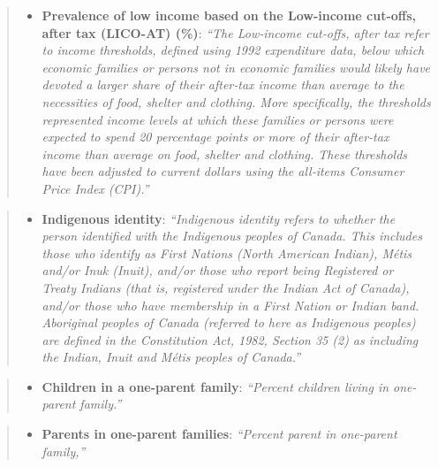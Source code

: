 \documentclass[preprint, 3p,
authoryear]{elsarticle} %
\providecommand{\tightlist}{%
  \setlength{\itemsep}{0pt}\setlength{\parskip}{0pt}}
\begin{document}
\begin{quote}
\begin{itemize}
\tightlist
\item
  \textbf{Prevalence of low income based on the Low-income cut-offs,
  after tax (LICO-AT) (\%)}: \emph{``The Low‑income cut‑offs, after tax
  refer to income thresholds, defined using 1992 expenditure data, below
  which economic families or persons not in economic families would
  likely have devoted a larger share of their after‑tax income than
  average to the necessities of food, shelter and clothing. More
  specifically, the thresholds represented income levels at which these
  families or persons were expected to spend 20 percentage points or
  more of their after‑tax income than average on food, shelter and
  clothing. These thresholds have been adjusted to current dollars using
  the all‑items Consumer Price Index (CPI).''}
\end{itemize}
\end{quote}

\begin{quote}
\begin{itemize}
\tightlist
\item
  \textbf{Indigenous identity}: \emph{``Indigenous identity refers to
  whether the person identified with the Indigenous peoples of Canada.
  This includes those who identify as First Nations (North American
  Indian), Métis and/or Inuk (Inuit), and/or those who report being
  Registered or Treaty Indians (that is, registered under the Indian Act
  of Canada), and/or those who have membership in a First Nation or
  Indian band. Aboriginal peoples of Canada (referred to here as
  Indigenous peoples) are defined in the Constitution Act, 1982, Section
  35 (2) as including the Indian, Inuit and Métis peoples of Canada.''}
\end{itemize}
\end{quote}

\begin{quote}
\begin{itemize}
\tightlist
\item
  \textbf{Children in a one-parent family}: \emph{``Percent children
  living in one-parent family.''}
\end{itemize}
\end{quote}

\begin{quote}
\begin{itemize}
\tightlist
\item
  \textbf{Parents in one-parent families}: \emph{``Percent parent in
  one-parent family,''}
\end{itemize}
\end{quote}
\end{document}
